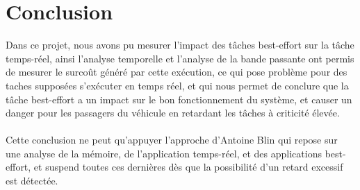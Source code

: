 \section*{Conclusion}
Dans ce projet, nous avons pu mesurer l'impact des tâches best-effort sur la tâche temps-réel, ainsi l'analyse temporelle et l'analyse de la bande passante ont permis de mesurer le surcoût généré par cette exécution, ce qui pose problème pour des taches supposées s'exécuter en temps réel, et qui nous permet de conclure que la tâche best-effort a un impact sur le bon fonctionnement du système, et causer un danger pour les passagers du véhicule en retardant les tâches à criticité élevée.\\
\\
Cette conclusion ne peut qu'appuyer l'approche d'Antoine Blin qui repose sur une analyse de la mémoire, de l'application temps-réel, et des applications best-effort, et suspend toutes ces dernières dès que la possibilité d'un retard excessif est détectée.
